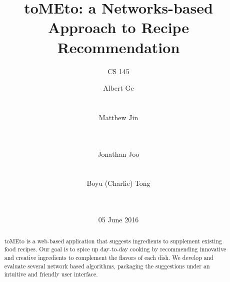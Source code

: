 \documentclass{acm_proc_article-sp}
\begin{document}
\title{toMEto: a Networks-based Approach to Recipe Recommendation}
\subtitle{CS 145}


\makeatletter
\def\BState{\State\hskip-\ALG@thistlm}
\makeatother


\author{
\alignauthor
Albert Ge\\
       \\
       \\
\alignauthor
Matthew Jin\\
       \\
       \\
\and %
\alignauthor
Jonathan Joo\\
       \\
       \\
\alignauthor
Boyu (Charlie) Tong\\
       \\
       \\
}

\date{05 June 2016}


\maketitle
\begin{abstract}
toMEto is a web-based application that suggests ingredients to supplement existing food recipes. Our goal is to spice up day-to-day cooking by recommending innovative and creative ingredients to complement the flavors of each dish. We develop and evaluate several network based algorithms, packaging the suggestions under an intuitive and friendly user interface. 
\end{abstract}



\end{document}
